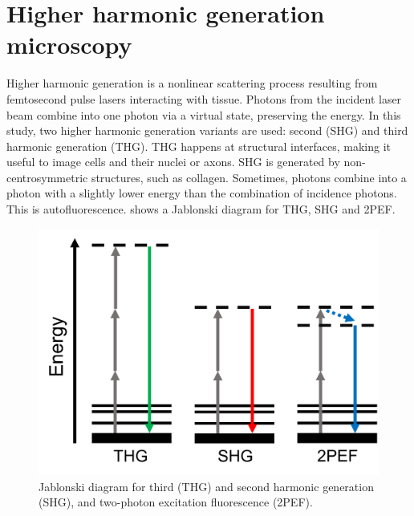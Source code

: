 \section{Higher harmonic generation microscopy}
Higher harmonic generation is a nonlinear scattering process resulting from femtosecond pulse lasers interacting with tissue.
Photons from the incident laser beam combine into one photon via a virtual state, preserving the energy.
In this study, two higher harmonic generation variants are used: second (SHG) and third harmonic generation (THG).
THG happens at structural interfaces, making it useful to image \eg cells and their nuclei or axons.
SHG is generated by non-centrosymmetric structures, such as collagen.
Sometimes, photons combine into a photon with a slightly lower energy than the combination of incidence photons.
This is autofluorescence.
 shows a Jablonski diagram for THG, SHG and 2PEF.

\begin{figure}[hb]
    \centering
    \includegraphics[width=\linewidth]{ANN/images/hhg-jablonski.png}
    \caption[HHG Jablonski diagram]{Jablonski diagram for third (THG) and second harmonic generation (SHG), and two-photon excitation fluorescence (2PEF).}
    \label{fig:hhg-jablonski}
\end{figure}
